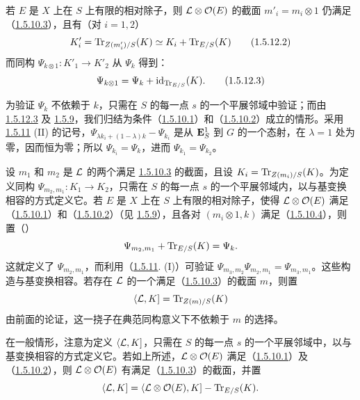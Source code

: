 若 $E$ 是 $X$ 上在 $S$ 上有限的相对除子，则 ${\mathcal L}\otimes {\mathcal O}(E)$ 的截面 $m'_{i}=m_{i}\otimes 1$ 仍满足（\hyperref[XVIII.par1.5.10.3]{1.5.10.3}），且有（对 $i=1,2$）
\begin{equation*}
K'_{i}=\operatorname{Tr}_{Z(m'_{i})/S}(K)\simeq K_{i}+\operatorname{Tr}_{E/S}(K)\tag{1.5.12.2}
\end{equation*}%
而同构 $\Psi_{k\otimes 1}:K'_{1}\rightarrow K'_{2}$ 从 $\Psi_{k}$ 得到：
\begin{equation*}
\Psi_{k\otimes 1}=\Psi_{k}+\operatorname{id}_{\operatorname{Tr}_{E/S}}(K){}.\tag{1.5.12.3}
\end{equation*}

为验证 $\Psi_{k}$ 不依赖于 $k$，只需在 $S$ 的每一点 $s$ 的一个平展邻域中验证；而由 \hyperref[XVIII.eq1.5.12.3]{1.5.12.3} 及 \hyperref[XVIII.lem1.5.9]{1.5.9}，我们\pageoriginale{}归结为条件（\hyperref[XVIII.par1.5.10.1]{1.5.10.1}）和（\hyperref[XVIII.par1.5.10.2]{1.5.10.2}）成立的情形。采用 \hyperref[XVIII.lem1.5.11]{1.5.11} (II) 的记号，$\Psi_{\lambda k_{i}+(1-\lambda)k}-\Psi_{k_{i}}$ 是从 $\mathbf{E}^{1}_{S}$ 到 $G$ 的一个态射，在 $\lambda =1$ 处为零，因而恒为零；所以 $\Psi_{k_{i}}=\Psi_{k}$，进而 $\Psi_{k_{1}}=\Psi_{k_{2}}$。

设 $m_{1}$ 和 $m_{2}$ 是 ${\mathcal L}$ 的两个满足 \hyperref[XVIII.par1.5.10.3]{1.5.10.3} 的截面，且设 $K_{i}=\operatorname{Tr}_{Z(m_{i})/S}(K)$。为定义同构 $\Psi_{m_{2},m_{1}}:K_{1}\rightarrow K_{2}$，只需在 $S$ 的每一点 $s$ 的一个平展邻域内，以与基变换相容的方式定义它。若 $E$ 是 $X$ 上在 $S$ 上有限的相对除子，使得 ${\mathcal L}\otimes {\mathcal O}(E)$ 满足（\hyperref[XVIII.par1.5.10.1]{1.5.10.1}）和（\hyperref[XVIII.par1.5.10.2]{1.5.10.2}）（见 \hyperref[XVIII.lem1.5.9]{1.5.9}），且各对 $(m_{i}\otimes 1,k)$ 满足（\hyperref[XVIII.par1.5.10.4]{1.5.10.4}），则置（\cf {}）
$$
\Psi_{m_{2},m_{1}}+\operatorname{Tr}_{E/S}(K)=\Psi_{k}{}.
$$
这就定义了 $\Psi_{m_{2},m_{1}}$，而利用（\hyperref[XVIII.lem1.5.11]{1.5.11}. (I)）可验证 $\Psi_{m_{3},m_{2}}\Psi_{m_{2},m_{1}}=\Psi_{m_{3},m_{1}}$。这些构造与基变换相容。若存在 ${\mathcal L}$ 的一个满足（\hyperref[XVIII.par1.5.10.3]{1.5.10.3}）的截面 $m$，则置
$$
\langle {\mathcal L},K]=\operatorname{Tr}_{Z(m)/S}(K)
$$
由前面的论证，这一挠子在典范同构意义下不依赖于 $m$ 的选择。

在一般情形，注意为定义 $\langle {\mathcal L},K]$，只需在 $S$ 的每一点 $s$ 的一个平展邻域中，以与基变换相容的方式定义它。若如上所述，${\mathcal L}\otimes {\mathcal O}(E)$ 满足（\hyperref[XVIII.par1.5.10.1]{1.5.10.1}）及（\hyperref[XVIII.par1.5.10.2]{1.5.10.2}），则 ${\mathcal L}\otimes {\mathcal O}(E)$ 有满足（\hyperref[XVIII.par1.5.10.3]{1.5.10.3}）的截面，并置
$$
\langle {\mathcal L},K]=\langle {\mathcal L}\otimes {\mathcal O}(E), K]-\operatorname{Tr}_{E/S}(K){}.
$$

